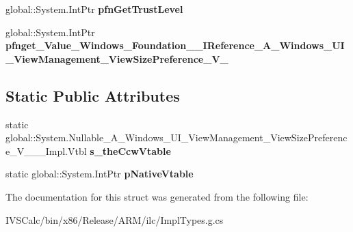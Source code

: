\begin{DoxyCompactItemize}
global\+::\+System.\+Int\+Ptr {\bfseries pfn\+Get\+Trust\+Level}
\item 
\mbox{\label{struct_system_1_1_nullable___a___windows___u_i___view_management___view_size_preference___v_______impl_1_1_vtbl_aba05eb163b4fda87bd30a45f37ddc803}} 
global\+::\+System.\+Int\+Ptr {\bfseries pfnget\+\_\+\+Value\+\_\+\+Windows\+\_\+\+Foundation\+\_\+\+\_\+\+I\+Reference\+\_\+\+A\+\_\+\+Windows\+\_\+\+U\+I\+\_\+\+View\+Management\+\_\+\+View\+Size\+Preference\+\_\+\+V\+\_\+}
\end{DoxyCompactItemize}
\subsection*{Static Public Attributes}
\begin{DoxyCompactItemize}
\item 
\mbox{\label{struct_system_1_1_nullable___a___windows___u_i___view_management___view_size_preference___v_______impl_1_1_vtbl_a4b665cde1d8dfcab8a2456da891ed681}} 
static global\+::\+System.\+Nullable\+\_\+\+A\+\_\+\+Windows\+\_\+\+U\+I\+\_\+\+View\+Management\+\_\+\+View\+Size\+Preference\+\_\+\+V\+\_\+\+\_\+\+\_\+\+Impl.\+Vtbl {\bfseries s\+\_\+the\+Ccw\+Vtable}
\item 
\mbox{\label{struct_system_1_1_nullable___a___windows___u_i___view_management___view_size_preference___v_______impl_1_1_vtbl_a928bd7b30ceac03e4a77133d36bccb6e}} 
static global\+::\+System.\+Int\+Ptr {\bfseries p\+Native\+Vtable}
\end{DoxyCompactItemize}


The documentation for this struct was generated from the following file\+:\begin{DoxyCompactItemize}
\item 
I\+V\+S\+Calc/bin/x86/\+Release/\+A\+R\+M/ilc/Impl\+Types.\+g.\+cs\end{DoxyCompactItemize}
